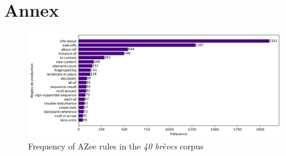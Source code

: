 \documentclass[../main.tex]{subfiles}
\begin{document}
\chapter{Annex}

\begin{figure}
    \centering \includegraphics[width = 5in]{chapters/intermediate_blocks_pose_correction/images/azee_rule_frequency.png}
    \caption{Frequency of AZee rules in the \emph{40 brèves} corpus}
    \label{fig:azee_rule_frequency}
\end{figure}
\end{document}
